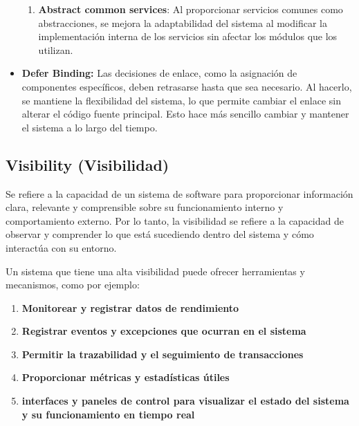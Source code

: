 \documentclass{article}
\begin{document}
\begin{itemize}
\begin{enumerate}
				\item \textbf{Abstract common services}: Al proporcionar servicios comunes como abstracciones, se mejora la adaptabilidad del sistema al modificar la implementación interna de los servicios sin afectar los módulos que los utilizan.
				
			\end{enumerate}	
						\item \textbf{Defer Binding:}
						Las decisiones de enlace, como la asignación de componentes específicos, deben retrasarse hasta que sea necesario. Al hacerlo, se mantiene la flexibilidad del sistema, lo que permite cambiar el enlace sin alterar el código fuente principal. Esto hace más sencillo cambiar y mantener el sistema a lo largo del tiempo.
				
		\end{itemize}
		
		\subsection{Visibility \small{(Visibilidad)} }\label{sec:visibilidad}
		Se refiere a la capacidad de un sistema de software para proporcionar información clara, relevante y comprensible sobre su funcionamiento interno y comportamiento externo. Por lo tanto, la visibilidad se refiere a la capacidad de observar y comprender lo que está sucediendo dentro del sistema y cómo interactúa con su entorno.
		
		Un sistema que tiene una alta visibilidad puede ofrecer herramientas y mecanismos, como por ejemplo: 
		
		\begin{enumerate}
			\item \textbf{Monitorear y registrar datos de rendimiento}
			
			\item \textbf{Registrar eventos y excepciones que ocurran en el sistema}
			
			\item \textbf{Permitir la trazabilidad y el seguimiento de transacciones}
			
			\item \textbf{Proporcionar métricas y estadísticas útiles}
			
			\item \textbf{interfaces y paneles de control para visualizar el estado del sistema y su funcionamiento en tiempo real}
			
		\end{enumerate}	
		
\end{document}
